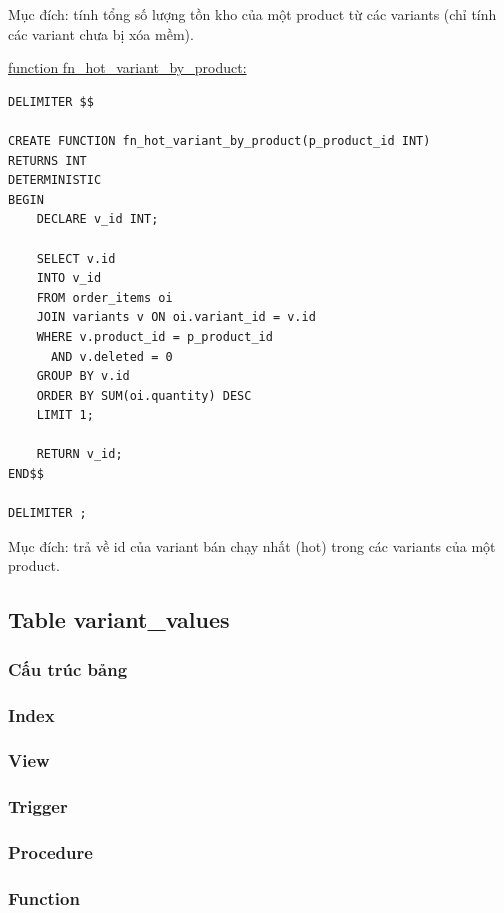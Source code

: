 Mục đích: tính tổng số lượng tồn kho của một product từ các variants (chỉ tính các variant chưa bị xóa mềm).

\underline{function fn\_hot\_variant\_by\_product:}

\begin{verbatim}
DELIMITER $$

CREATE FUNCTION fn_hot_variant_by_product(p_product_id INT)
RETURNS INT
DETERMINISTIC
BEGIN
    DECLARE v_id INT;

    SELECT v.id
    INTO v_id
    FROM order_items oi
    JOIN variants v ON oi.variant_id = v.id
    WHERE v.product_id = p_product_id
      AND v.deleted = 0
    GROUP BY v.id
    ORDER BY SUM(oi.quantity) DESC
    LIMIT 1;

    RETURN v_id;
END$$

DELIMITER ;
\end{verbatim}

Mục đích: trả về id của variant bán chạy nhất (hot) trong các variants của một product.

\subsection{Table variant\_values}

\subsubsection{Cấu trúc bảng}

\subsubsection{Index}

\subsubsection{View}

\subsubsection{Trigger}

\subsubsection{Procedure}

\subsubsection{Function}

